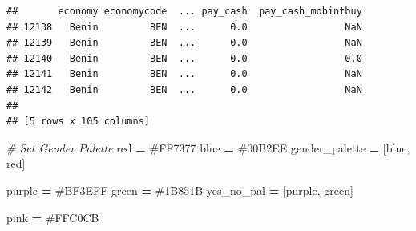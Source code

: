 \documentclass[water,article,submit,moreauthors,pdftex]{mdpi}
\newenvironment{Shaded}{\begin{snugshade}}{\end{snugshade}}
\newcommand{\CommentTok}[1]{\textcolor[rgb]{0.56,0.35,0.01}{\textit{#1}}}
\newcommand{\NormalTok}[1]{#1}
\newcommand{\OperatorTok}[1]{\textcolor[rgb]{0.81,0.36,0.00}{\textbf{#1}}}
\newcommand{\StringTok}[1]{\textcolor[rgb]{0.31,0.60,0.02}{#1}}
\begin{document}
\begin{verbatim}
##       economy economycode  ... pay_cash  pay_cash_mobintbuy
## 12138   Benin         BEN  ...      0.0                 NaN
## 12139   Benin         BEN  ...      0.0                 NaN
## 12140   Benin         BEN  ...      0.0                 0.0
## 12141   Benin         BEN  ...      0.0                 NaN
## 12142   Benin         BEN  ...      0.0                 NaN
## 
## [5 rows x 105 columns]
\end{verbatim}

\begin{Shaded}
\begin{Highlighting}[]
\CommentTok{\# Set Gender Palette}
\NormalTok{red }\OperatorTok{=} \StringTok{\textquotesingle{}\#FF7377\textquotesingle{}}
\NormalTok{blue }\OperatorTok{=} \StringTok{\textquotesingle{}\#00B2EE\textquotesingle{}}
\NormalTok{gender\_palette }\OperatorTok{=}\NormalTok{ [blue, red]}

\NormalTok{purple }\OperatorTok{=} \StringTok{\textquotesingle{}\#BF3EFF\textquotesingle{}}
\NormalTok{green }\OperatorTok{=} \StringTok{\textquotesingle{}\#1B851B\textquotesingle{}}
\NormalTok{yes\_no\_pal }\OperatorTok{=}\NormalTok{ [purple, green]}

\NormalTok{pink }\OperatorTok{=} \StringTok{\textquotesingle{}\#FFC0CB\textquotesingle{}}
\end{Highlighting}
\end{Shaded}
\end{document}

